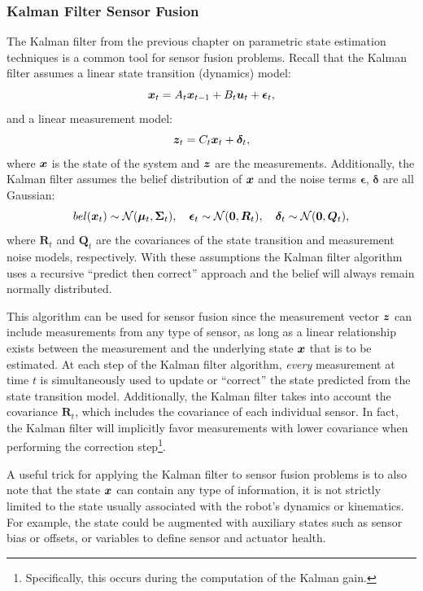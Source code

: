 \subsubsection{Kalman Filter Sensor Fusion}
The Kalman filter from the previous chapter on parametric state estimation techniques is a common tool for sensor fusion problems. Recall that the Kalman filter assumes a linear state transition (dynamics) model:
\begin{equation} \label{eq:KFSFdynamics}
    \bm{x}_t = A_t \bm{x}_{t-1} + B_t \bm{u}_t + \bm{\epsilon}_t,
\end{equation}
and a linear measurement model:
\begin{equation} \label{eq:KFSFmeasure}
\bm{z}_t = C_t \bm{x}_t + \bm{\delta}_t,
\end{equation}
where $\bm{x}$ is the state of the system and $\bm{z}$ are the measurements. Additionally, the Kalman filter assumes the belief distribution of $\bm{x}$ and the noise terms $\bm{\epsilon}$, $\bm{\delta}$ are all Gaussian:
\begin{equation*}
bel(\bm{x}_t) \sim \mathcal{N}(\bm{\mu}_t, \bm{\Sigma}_t), \quad \bm{\epsilon}_t \sim \mathcal{N}(\bm{0}, \bm{R}_t), \quad \bm{\delta}_t \sim \mathcal{N}(\bm{0}, \bm{Q}_t),
\end{equation*}
where $\bm{R}_t$ and $\bm{Q}_t$ are the covariances of the state transition and measurement noise models, respectively.
With these assumptions the Kalman filter algorithm uses a recursive ``predict then correct'' approach and the belief will always remain normally distributed.

This algorithm can be used for sensor fusion since the measurement vector $\bm{z}$ can include measurements from any type of sensor, as long as a linear relationship exists between the measurement and the underlying state $\bm{x}$ that is to be estimated. At each step of the Kalman filter algorithm, \textit{every} measurement at time $t$ is simultaneously used to update or ``correct'' the state predicted from the state transition model. Additionally, the Kalman filter takes into account the covariance $\bm{R}_t$, which includes the covariance of each individual sensor. In fact, the Kalman filter will implicitly favor measurements with lower covariance when performing the correction step\footnote{Specifically, this occurs during the computation of the Kalman gain.}.

A useful trick for applying the Kalman filter to sensor fusion problems is to also note that the state $\bm{x}$ can contain any type of information, it is not strictly limited to the state usually associated with the robot's dynamics or kinematics. For example, the state could be augmented with auxiliary states such as sensor bias or offsets, or variables to define sensor and actuator health.


